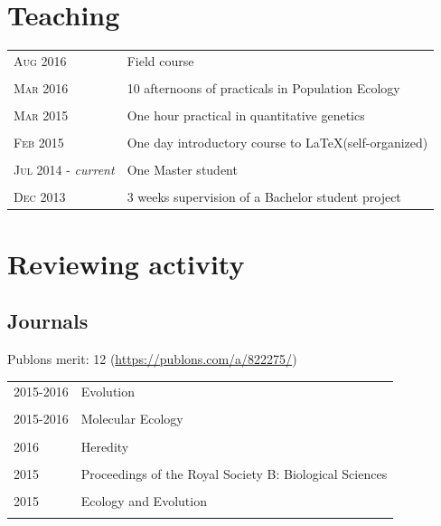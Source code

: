 \section{Teaching}
\begin{tabular}{p{4cm}|p{11cm}}
\hfill \textsc{Aug 2016} & Field course\\
\multicolumn{2}{c}{} \\
\hfill \textsc{Mar 2016} & 10 afternoons of practicals in Population Ecology \\
\multicolumn{2}{c}{} \\
\hfill \textsc{Mar 2015} & One hour practical in quantitative genetics\\
\multicolumn{2}{c}{} \\
\hfill \textsc{Feb 2015} & One day introductory course to \LaTeX (self-organized)\\
\multicolumn{2}{c}{} \\
\hfill \textsc{Jul 2014 -} \emph{current} & One Master student\\
\multicolumn{2}{c}{} \\
\hfill \textsc{Dec 2013} & 3 weeks supervision of a Bachelor student project\\
\end{tabular}

\section{Reviewing activity}
\subsection{Journals}
Publons merit: 12 (\url{https://publons.com/a/822275/})
\begin{table}[h]
\begin{tabular}{p{4cm}|p{11cm}}
\hfill \textsc{2015-2016} & Evolution\\
\multicolumn{2}{c}{} \\
\hfill \textsc{2015-2016} & Molecular Ecology\\
\multicolumn{2}{c}{} \\
\hfill \textsc{2016} & Heredity\\
\multicolumn{2}{c}{} \\
\hfill \textsc{2015} & Proceedings of the Royal Society B: Biological Sciences\\
\multicolumn{2}{c}{} \\
\hfill \textsc{2015} & Ecology and Evolution\\
\multicolumn{2}{c}{} \\
\end{tabular}
\end{table}

